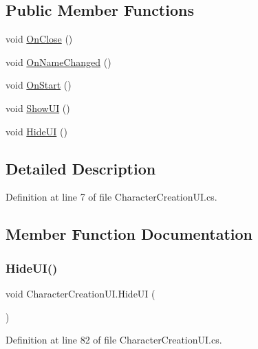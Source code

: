 \subsection*{Public Member Functions}
\begin{DoxyCompactItemize}
\item 
void \mbox{\hyperlink{class_character_creation_u_i_a3a3792f0c251839acb08848c3bf0e6e0}{On\+Close}} ()
\item 
void \mbox{\hyperlink{class_character_creation_u_i_a07db6ab68cff5c8d43ed3809e45efe0c}{On\+Name\+Changed}} ()
\item 
void \mbox{\hyperlink{class_character_creation_u_i_a656b1552f06f9611f9672489e03f8936}{On\+Start}} ()
\item 
void \mbox{\hyperlink{class_character_creation_u_i_a5e683c30d28a4c97d8f84de3de2062cd}{Show\+UI}} ()
\item 
void \mbox{\hyperlink{class_character_creation_u_i_a1724d7136e40f03376f720ec0ecb2d83}{Hide\+UI}} ()
\end{DoxyCompactItemize}


\subsection{Detailed Description}


Definition at line 7 of file Character\+Creation\+U\+I.\+cs.



\subsection{Member Function Documentation}
\mbox{\label{class_character_creation_u_i_a1724d7136e40f03376f720ec0ecb2d83}} 
\subsubsection{\texorpdfstring{HideUI()}{HideUI()}}
{\footnotesize\ttfamily void Character\+Creation\+U\+I.\+Hide\+UI (\begin{DoxyParamCaption}{ }\end{DoxyParamCaption})}



Definition at line 82 of file Character\+Creation\+U\+I.\+cs.

